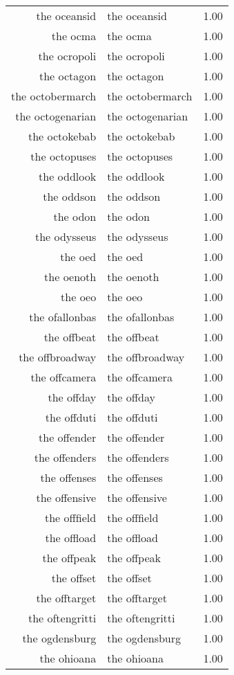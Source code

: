 \begin{table}[ht]
\begin{tabular}{rlr}
  the oceansid & the oceansid & 1.00 \\ 
  the ocma & the ocma & 1.00 \\ 
  the ocropoli & the ocropoli & 1.00 \\ 
  the octagon & the octagon & 1.00 \\ 
  the octobermarch & the octobermarch & 1.00 \\ 
  the octogenarian & the octogenarian & 1.00 \\ 
  the octokebab & the octokebab & 1.00 \\ 
  the octopuses & the octopuses & 1.00 \\ 
  the oddlook & the oddlook & 1.00 \\ 
  the oddson & the oddson & 1.00 \\ 
  the odon & the odon & 1.00 \\ 
  the odysseus & the odysseus & 1.00 \\ 
  the oed & the oed & 1.00 \\ 
  the oenoth & the oenoth & 1.00 \\ 
  the oeo & the oeo & 1.00 \\ 
  the ofallonbas & the ofallonbas & 1.00 \\ 
  the offbeat & the offbeat & 1.00 \\ 
  the offbroadway & the offbroadway & 1.00 \\ 
  the offcamera & the offcamera & 1.00 \\ 
  the offday & the offday & 1.00 \\ 
  the offduti & the offduti & 1.00 \\ 
  the offender & the offender & 1.00 \\ 
  the offenders & the offenders & 1.00 \\ 
  the offenses & the offenses & 1.00 \\ 
  the offensive & the offensive & 1.00 \\ 
  the offfield & the offfield & 1.00 \\ 
  the offload & the offload & 1.00 \\ 
  the offpeak & the offpeak & 1.00 \\ 
  the offset & the offset & 1.00 \\ 
  the offtarget & the offtarget & 1.00 \\ 
  the oftengritti & the oftengritti & 1.00 \\ 
  the ogdensburg & the ogdensburg & 1.00 \\ 
  the ohioana & the ohioana & 1.00 \\ 

\end{tabular}
\end{table}
